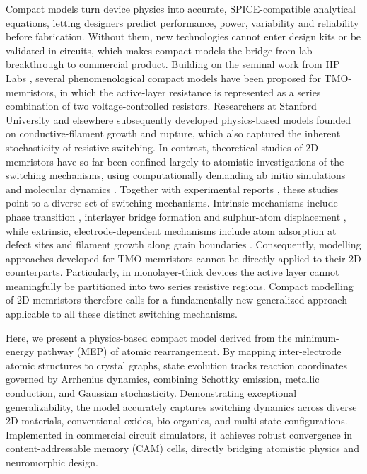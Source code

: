 \documentclass[aip,apl,reprint,floatfix]{revtex4-2}
\begin{document}
Compact models turn device physics into accurate, SPICE-compatible analytical equations, letting designers predict performance, power, variability and reliability before fabrication. Without them, new technologies cannot enter design kits or be validated in circuits, which makes compact models the bridge from lab breakthrough to commercial product. Building on the seminal work from HP Labs \cite{Strukov2008}, several phenomenological compact models \cite{Pickett2009Switching,Kvatinsky2013TEAM} have been proposed for TMO-memristors, in which the active-layer resistance is represented as a series combination of two voltage-controlled resistors. Researchers at Stanford University \cite{Jiang} and elsewhere \cite{Yu,Guan2012,Huang2013,Li2014} subsequently developed physics-based models founded on conductive-filament growth and rupture, which also captured the inherent stochasticity of resistive switching. In contrast, theoretical studies of 2D memristors have so far been confined largely to atomistic investigations of the switching mechanisms, using computationally demanding ab initio simulations and molecular dynamics \cite{Mitra2024Atomistic}. Together with experimental reports \cite{atomrister,zhang2019electric}, these studies point to a diverse set of switching mechanisms. Intrinsic mechanisms include phase transition \cite{zhang2019electric}, interlayer bridge formation \cite{Ducry2022} and sulphur-atom displacement \cite{Mitra2021}, while extrinsic, electrode-dependent mechanisms include atom adsorption at defect sites \cite{Hus2021,Ge2018} and filament growth along grain boundaries \cite{Sangwan2015}. Consequently, modelling approaches developed for TMO memristors cannot be directly applied to their 2D counterparts. Particularly, in monolayer-thick devices \cite{Rajput2024DefectEngineered} the active layer cannot meaningfully be partitioned into two series resistive regions. Compact modelling of 2D memristors therefore calls for a fundamentally new generalized approach applicable to all these distinct switching mechanisms. 

Here, we present a physics-based compact model derived from the minimum-energy pathway (MEP) of atomic rearrangement. By mapping inter-electrode atomic structures to crystal graphs, state evolution tracks reaction coordinates governed by Arrhenius dynamics, combining Schottky emission, metallic conduction, and Gaussian stochasticity. Demonstrating exceptional generalizability, the model accurately captures switching dynamics across diverse 2D materials, conventional oxides, bio-organics, and multi-state configurations. Implemented in commercial circuit simulators, it achieves robust convergence in content-addressable memory (CAM) cells, directly bridging atomistic physics and neuromorphic design.
\end{document}
